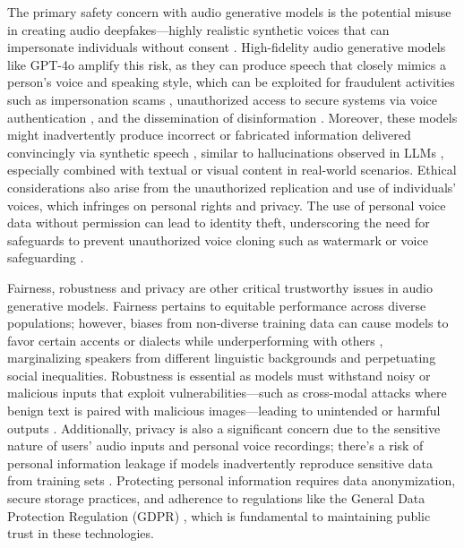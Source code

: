 The primary safety concern with audio generative models is the potential misuse in creating audio deepfakes—highly realistic synthetic voices that can impersonate individuals without consent \citep{khanjani2023audio, blue2022you, mai2023warning}. High-fidelity audio generative models like GPT-4o amplify this risk, as they can produce speech that closely mimics a person's voice and speaking style, which can be exploited for fraudulent activities such as impersonation scams \citep{Stupp2019}, unauthorized access to secure systems via voice authentication \citep{Kimery2024}, and the dissemination of disinformation \citep{ChesneyCitron2019, Sample2019}.
Moreover, these models might inadvertently produce incorrect or fabricated information delivered convincingly via synthetic speech \citep{hurst2024gpt,li2024sonar}, similar to hallucinations observed in LLMs \citep{rawte2023survey}, especially combined with textual or visual content in real-world scenarios\citep{ying2024safebench}. Ethical considerations also arise from the unauthorized replication and use of individuals' voices, which infringes on personal rights and privacy. The use of personal voice data without permission can lead to identity theft, underscoring the need for safeguards to prevent unauthorized voice cloning such as watermark \citep{roman2024latent} or voice safeguarding \citep{mckee2024safeguarding}.

Fairness, robustness and privacy are other critical trustworthy issues in audio generative models. Fairness pertains to equitable performance across diverse populations; however, biases from non-diverse training data can cause models to favor certain accents or dialects while underperforming with others \citep{yu2024large}, marginalizing speakers from different linguistic backgrounds and perpetuating social inequalities. Robustness is essential as models must withstand noisy or malicious inputs that exploit vulnerabilities—such as cross-modal attacks where benign text is paired with malicious images—leading to unintended or harmful outputs \citep{xie2021enabling, shen2024voice,kang2024advwave}. Additionally, privacy is also a significant concern due to the sensitive nature of users' audio inputs and personal voice recordings; there's a risk of personal information leakage if models inadvertently reproduce sensitive data from training sets \citep{zhang2022volere}. Protecting personal information requires data anonymization, secure storage practices, and adherence to regulations like the General Data Protection Regulation (GDPR) \citep{hoofnagle2019european}, which is fundamental to maintaining public trust in these technologies.

